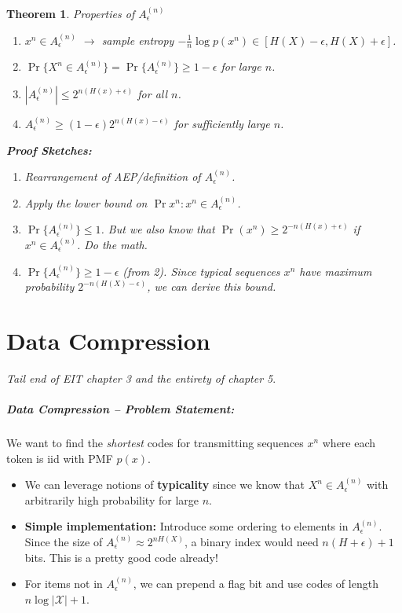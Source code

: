 \documentclass[a4paper,12pt]{report}
\newtheorem{theorem}{Theorem}
\begin{document}
\begin{theorem}{Properties of $A_\epsilon^{(n)}$}
\begin{enumerate}
\item $x^n \in A_\epsilon^{(n)}$ $\to$ sample entropy $- \frac 1 n \log p(x^n)
\in [H(X)-\epsilon, H(X)+\epsilon]$.
\item $\Pr\{X^n \in A_\epsilon^{(n)}\} = \Pr\{A_\epsilon^{(n)}\} \geq
1-\epsilon$ for large $n$.
\item $|A_\epsilon^{(n)}| \leq 2^{n(H(x) + \epsilon)}$ for all $n$.
\item $A_\epsilon^{(n)} \geq (1-\epsilon) 2^{n(H(x) - \epsilon)}$ for
sufficiently large $n$.
\end{enumerate}

\textbf{Proof Sketches:} 
\begin{enumerate}
\item Rearrangement of AEP/definition of $A_\epsilon^{(n)}$.
\item Apply the lower bound on $\Pr{x^n}: x^n\in A_\epsilon^{(n)}$.
\item $\Pr\{A_\epsilon^{(n)}\} \leq 1$. But we also know that $\Pr(x^n) \geq
2^{-n(H(x) + \epsilon)}$ if $x^n \in A_\epsilon^{(n)}$. Do the math.
\item $\Pr\{A_\epsilon^{(n)}\} \geq 1-\epsilon$ (from 2). Since typical
sequences $x^n$ have maximum probability $2^{-n(H(X)-\epsilon)}$, we can derive
this bound.
\end{enumerate}

\end{theorem}





\chapter{Data Compression}

\textit{Tail end of EIT chapter 3 and the entirety of chapter 5}.


\paragraph{Data Compression -- Problem Statement: } We want to find the
\textit{shortest} codes for transmitting sequences $x^n$ where each token is iid
with PMF $p(x)$. 
\begin{itemize}
\item We can leverage notions of \textbf{typicality} since we know that $X^n \in
A_\epsilon^{(n)}$ with arbitrarily high probability for large $n$.
\item \textbf{Simple implementation:} Introduce some ordering to elements in
$A_\epsilon^{(n)}$. Since the size of $A_\epsilon^{(n)} \approx 2^{nH(X)}$, a
binary index would need $n(H+\epsilon) + 1$ bits. This is a pretty good code
already!
\item For items not in $A_\epsilon^{(n)}$, we can prepend a flag bit and use
codes of length $n \log |\mathcal X| + 1$.
\end{itemize}
\end{document}
